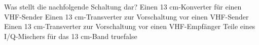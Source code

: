     {Was stellt die nachfolgende Schaltung dar?}
    {Einen 13 cm-Konverter für einen VHF-Sender}
    {Einen 13 cm-Transverter zur Vorschaltung vor einen VHF-Sender}
    {Einen 13 cm-Transverter zur Vorschaltung vor einen VHF-Emp\-fänger}
    {Teile eines I/Q-Mischers für das 13 cm-Band}
    {true}{false}